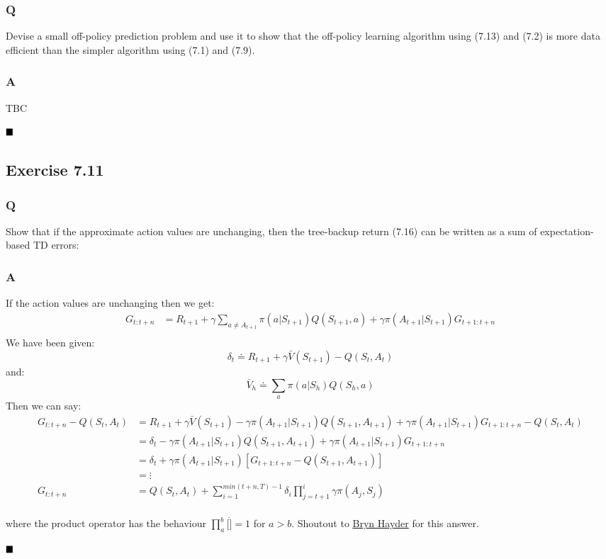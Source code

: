\subsubsection{Q}
Devise a small off-policy prediction problem and use it to show that the off-policy learning algorithm using (7.13) and (7.2) is more data efficient than the simpler algorithm using (7.1) and (7.9).
\subsubsection{A}
TBC

$
\hfill \blacksquare
$

\subsection{Exercise 7.11}
\subsubsection{Q}
Show that if the approximate action values are unchanging, then the tree-backup return (7.16) can be written as a sum of expectation-based TD errors:
\subsubsection{A}
If the action values are unchanging then we get: 
\begin{align}
G_{t:t+n} &= R_{t+1} + \gamma \sum_{a \neq A_{t+1}} \pi(a | S_{t+1}) Q(S_{t+1}, a) + \gamma \pi(A_{t+1} | S_{t+1})G_{t+1:t+n} \\
\end{align}
We have been given:
\begin{equation}
\delta_t \doteq R_{t+1} + \gamma \bar{V}(S_{t+1}) - Q(S_t, A_t)
\end{equation}
and:
\begin{equation}
\bar{V}_h \doteq \sum_{a} \pi(a | S_h) Q(S_h, a)
\end{equation}
Then we can say:
\begin{align}
G_{t:t+n} - Q(S_t, A_t) &= R_{t+1} + \gamma \bar{V}(S_{t+1}) - \gamma \pi(A_{t+1}| S_{t+1}) Q(S_{t+1}, A_{t+1}) + \gamma \pi(A_{t+1} | S_{t+1})G_{t+1:t+n} - Q(S_t, A_t) \\
&= \delta_t  - \gamma \pi(A_{t+1}| S_{t+1}) Q(S_{t+1}, A_{t+1}) + \gamma \pi(A_{t+1} | S_{t+1})G_{t+1:t+n} \\
&= \delta_t + \gamma \pi(A_{t+1}| S_{t+1}) \left[G_{t+1:t+n} - Q(S_{t+1}, A_{t+1})\right] \\
&= \vdots \\
G_{t:t+n} &= Q(S_t, A_t) +  \sum_{i=1}^{min(t+n, T) -1} \delta_{i} \prod_{j=t+1}^{i} \gamma \pi(A_j, S_j) \\
\end{align}

where the product operator has the behaviour $\prod_{a}^{b}[\dot] = 1$ for $a>b$. Shoutout to \href{https://github.com/brynhayder/reinforcement_learning_an_introduction/blob/master/exercises/exercises.pdf}{Bryn Hayder} for this answer.

$
\hfill \blacksquare
$
